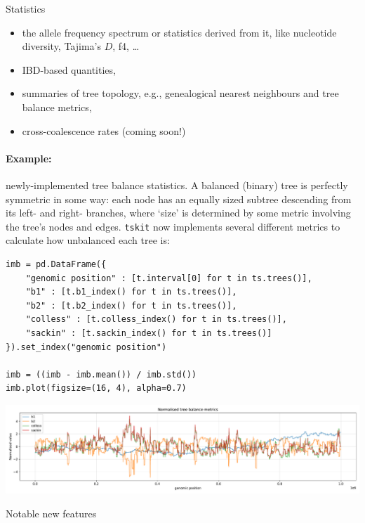 \documentclass[landscape,a0paper,fontscale=0.4]{baposter}
\newcommand{\tskit}{{\texttt{tskit}}}
\newcommand{\compresslist}{%
 \setlength{\itemsep}{1pt}%
 \setlength{\parskip}{0pt}%
 \setlength{\parsep}{0pt}%
 }
\begin{document}
\begin{poster}
\begin{posterbox}[name=stats,column=3,row=0,span=1]{Statistics}
\begin{itemize} \compresslist
    \item the allele frequency spectrum or statistics derived from it,
        like nucleotide diversity, Tajima's $D$, f4, \ldots
    \item IBD-based quantities,
    \item summaries of tree topology,
        e.g., genealogical nearest neighbours and tree balance metrics,
    \item cross-coalescence rates (coming soon!)
\end{itemize}

\paragraph{Example:} newly-implemented tree balance statistics. A balanced
(binary) tree is perfectly symmetric in some way: each node has an equally
sized subtree descending from its left- and right- branches, where `size'
is determined by some metric involving the tree's nodes and edges. \tskit{}
now implements several different metrics to calculate how unbalanced each
tree is:

\begin{verbatim}
imb = pd.DataFrame({
    "genomic position" : [t.interval[0] for t in ts.trees()],
    "b1" : [t.b1_index() for t in ts.trees()],
    "b2" : [t.b2_index() for t in ts.trees()],
    "colless" : [t.colless_index() for t in ts.trees()],
    "sackin" : [t.sackin_index() for t in ts.trees()]
}).set_index("genomic position")

imb = ((imb - imb.mean()) / imb.std())
imb.plot(figsize=(16, 4), alpha=0.7)
\end{verbatim}
\includegraphics[width=\textwidth]{tree_balance}

\end{posterbox}


\begin{posterbox}[name=operations,column=3,above=bottom,span=1]{Notable new features}


\end{posterbox}
\end{poster}
\end{document}
